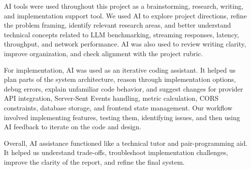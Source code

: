 \documentclass[11pt, a4paper]{article}
\begin{document}
AI tools were used throughout this project as a brainstorming, research, writing, and implementation support tool. We used AI to explore project directions, refine the problem framing, identify relevant research areas, and better understand technical concepts related to LLM benchmarking, streaming responses, latency, throughput, and network performance. AI was also used to review writing clarity, improve organization, and check alignment with the project rubric.

For implementation, AI was used as an iterative coding assistant. It helped us plan parts of the system architecture, reason through implementation options, debug errors, explain unfamiliar code behavior, and suggest changes for provider API integration, Server-Sent Events handling, metric calculation, CORS constraints, database storage, and frontend state management. Our workflow involved implementing features, testing them, identifying issues, and then using AI feedback to iterate on the code and design.

Overall, AI assistance functioned like a technical tutor and pair-programming aid. It helped us understand trade-offs, troubleshoot implementation challenges, improve the clarity of the report, and refine the final system.
\end{document}
